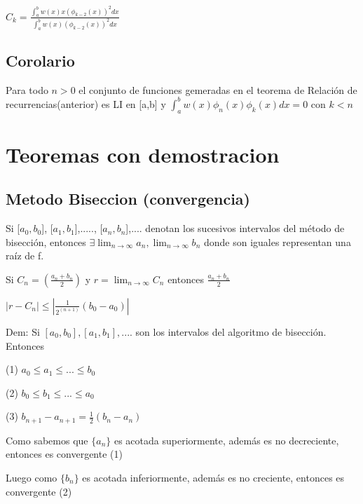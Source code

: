 \documentclass{article}
\begin{document}
$C_k = \frac{\displaystyle\int_{a}^{b}w(x)x(\phi_{k-2}(x))^2dx}{\displaystyle\int_{a}^{b}w(x)(\phi_{k-2}(x))^2dx}$


 \vspace{5mm}


 \subsection{Corolario}\label{Metodo-Newton-Global}

Para todo $n > 0$ el conjunto de funciones gemeradas en el teorema de Relación de recurrencias(anterior) es LI en [a,b]
y $\displaystyle\int_{a}^{b}w(x)\phi_n(x)\phi_k(x)dx = 0$ con $k < n$


 \vspace{5mm}





\section{Teoremas con demostracion}

\subsection{Metodo Biseccion (convergencia)}\label{Metodo-Biseccion-(convergencia)}

Si [$a_0,b_0$], [$a_1,b_1$],....., [$a_n,b_n$],.... denotan los sucesivos intervalos del método de bisección, entonces
$ \exists \lim_{n \to \infty} a_n, \lim_{n \to \infty} b_n $ donde son iguales representan una raíz de f.

Si $  C_n =  \left( \displaystyle\frac{a_n+b_n}{2} \right) $ y $r = \lim_{n \to \infty} C_n$ entonces
$\frac{a_n+b_n}{2}$

$| r - C_n | \leq | \frac{1}{2^{(n+1)}}(b_0 - a_0) |$

 \vspace{5mm}


Dem: Si $[a_0,b_0],[a_1,b_1],....$ son los intervalos del algoritmo de bisección. Entonces

(1) $a_0 \leq a_1 \leq ... \leq b_0 $

(2) $b_0 \leq b_1 \leq ... \leq a_0 $

(3) $b_{n+1}-a_{n+1} = \frac{1}{2}(b_n-a_n)$


Como sabemos que $\{ a_n \}$ es acotada superiormente, además es no decreciente, entonces es convergente (1)

Luego como $\{ b_n \}$ es acotada inferiormente, además es no creciente, entonces es convergente (2)
\end{document}
